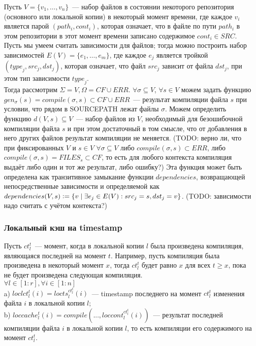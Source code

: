 Пусть $V = \{v_1, \dots, v_n\}$~--- набор файлов в состоянии некоторого репозитория (основного или локальной копии) в некоторый момент времени, где каждое $v_i$ является парой $(path_i, cont_i)$, которая означает, что в файле по пути $path_i$ в этом репозитории в этот момент времени записано содержимое $cont_i \in SRC$. Пусть мы умеем считать зависимости для файлов; тогда можно построить набор зависимостей $E(V) = \{e_1, \dots, e_m\}$, где каждое $e_j$ является тройкой $(\textit{type}_j, \textit{src}_j, \textit{dst}_j)$, которая означает, что файл $\textit{src}_j$ зависит от файла $\textit{dst}_j$, при этом тип зависимости $\textit{type}_j$.\\

Тогда рассмотрим $\Sigma = V, \Omega = CF \cup ERR$. $\forall \sigma \subseteq V$, $\forall s \in V$ можем задать функцию $gen_\sigma(s) = \textit{compile}(\sigma, s) \subset CF \cup ERR$~--- результат компиляции файла $s$ при условии, что рядом в SOURCEPATH лежат файлы $\sigma$. Можем определить функцию $d(V,s) \subseteq V$~--- набор файлов из $V$, необходимый для безошибочной компиляции файла $s$ и при этом достаточный в том смысле, что от добавления в него других файлов результат компиляции не меняется. (TODO: верно ли, что при фиксированных $V$ и $s \in V$ $\forall \sigma \subseteq V$ либо $\textit{compile}(\sigma, s) \subset ERR$, либо $\textit{compile}(\sigma, s) = FILES_s \subset CF$, то есть для любого контекста компиляция выдаёт либо один и тот же результат, либо ошибку?) Эта функция может быть определена как транзитивное замыкание функции $dependencies$, возвращающей непосредственные зависимости и определяемой как $dependencies(V,s) \vcentcolon= \{v \mid \exists e_j \in E(V): src_j = s, dst_j = v\}$. (TODO: зависимости надо считать с учётом контекста?)

\subsubsection{Локальный кэш на timestamp}

Пусть $ct_l^t$~--- момент, когда в локальной копии $l$ была произведена компиляция, являющаяся последней на момент $t$. Например, пусть компиляция была произведена в некоторый момент $x$, тогда $ct_l^t$ будет равно $x$ для всех $t \geqslant x$, пока не будет произведена следующая компиляция.\\
$\forall l \in [1:r], \forall i \in [1:n]$\\
\indent a) $loclct_l^t(i) = locts_l^{ct_l^t}(i)$~--- timestamp последнего на момент $ct_l^t$ изменения файла $i$ в локальной копии $l$;\\
\indent b) $loccache_l^t(i) = compile(..., loccont_l^{ct_l^t}(i))$~--- результат последней компиляции файла $i$ в локальной копии $l$, то есть компиляции его содержимого на момент $ct_l^t$.\\

